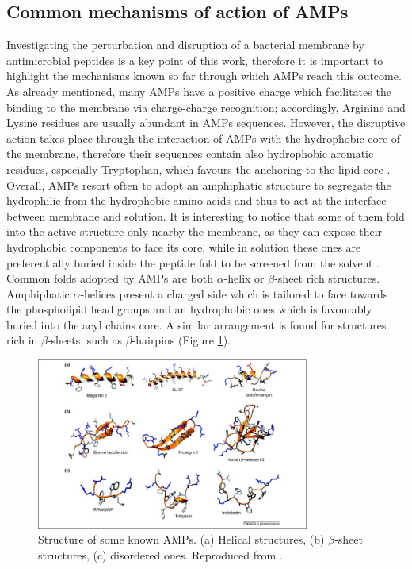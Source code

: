 \subsection{Common mechanisms of action of AMPs} \label{AMP_mechs}
Investigating the perturbation and disruption of a bacterial membrane by antimicrobial peptides is a key point of this work, therefore it is important to highlight the mechanisms known so far through which AMPs reach this outcome.
%
As already mentioned, many AMPs have a positive charge which facilitates the binding to the membrane via charge-charge recognition; accordingly, Arginine and Lysine residues are usually abundant in AMPs sequences. However, the disruptive action takes place through the interaction of AMPs with the hydrophobic core of the membrane, therefore their sequences contain also hydrophobic aromatic residues, especially Tryptophan, which favours the anchoring to the lipid core \citep{Chan2006}.
%
Overall, AMPs resort often to adopt an amphiphatic structure to segregate the hydrophilic from the hydrophobic amino acids and thus to act at the interface between membrane and solution. It is interesting to notice that some of them fold into the active structure only nearby the membrane, as they can expose their hydrophobic components to face its core, while in solution these ones are preferentially buried inside the peptide fold to be screened from the solvent \citep{Nguyen2011}.
%
Common folds adopted by AMPs are both $\alpha$-helix or $\beta$-sheet rich structures. Amphiphatic $\alpha$-helices present a charged side which is tailored to face towards the phospholipid head groups and an hydrophobic ones which is favourably buried into the acyl chains core.
%
A similar arrangement is found for structures rich in $\beta$-sheets, such as $\beta$-hairpins (Figure \ref{fig:amp_structure}).


\begin{figure}[t!]
\begin{center}
\includegraphics[width = 0.8\textwidth]{1introduction/pics/AMP_many.jpg}
\caption[Structure of some known AMPs.]{Structure of some known AMPs. (a) Helical structures, (b) $\beta$-sheet structures, (c) disordered ones. Reproduced from \citep{Nguyen2011}.} \label{fig:amp_structure}
\end{center}
\end{figure}


